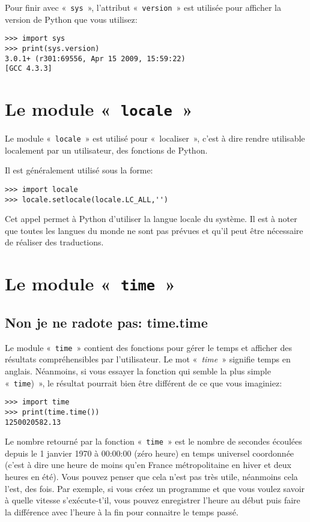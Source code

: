 Pour finir avec «~\texttt{sys}~», l'attribut «~\verb+version+~» est utilisée pour afficher la version de Python que vous utilisez:

\begin{Verbatim}[frame=single,rulecolor=\color{gray}]
>>> import sys
>>> print(sys.version)
3.0.1+ (r301:69556, Apr 15 2009, 15:59:22) 
[GCC 4.3.3]
\end{Verbatim}

\section{Le module «~\texttt{locale}~»}
Le module «~\texttt{locale}~» est utilisé pour «~localiser~», c'est à dire rendre utilisable localement par un utilisateur, des fonctions de Python.

Il est généralement utilisé sous la forme:
\begin{Verbatim}[frame=single,rulecolor=\color{gray}]
>>> import locale
>>> locale.setlocale(locale.LC_ALL,'')
\end{Verbatim}

Cet appel permet à Python d'utiliser la langue locale du système. Il est à noter que toutes les langues du monde ne sont pas prévues et qu'il peut être nécessaire de réaliser des traductions.

\section{Le module «~\texttt{time}~»}
\subsection{Non je ne radote pas: time.time }

Le module «~\texttt{time}~» contient des fonctions pour gérer le temps et afficher des résultats compréhensibles par l'utilisateur. Le mot «~\emph{time}~» signifie temps en anglais. Néanmoins, si vous essayer la fonction qui semble la plus simple «~\verb+time+)~», le résultat pourrait bien être différent de ce que vous imaginiez:

\begin{Verbatim}[frame=single,rulecolor=\color{gray}]
>>> import time
>>> print(time.time())
1250020582.13
\end{Verbatim}

Le nombre retourné par la fonction «~\texttt{time}~»  est le nombre de secondes écoulées depuis le 1 janvier 1970 à 00:00:00 (zéro heure) en temps universel coordonnée (c'est à dire une heure de moins qu'en France métropolitaine en hiver et deux heures en été). Vous pouvez penser que cela n'est pas très utile, néanmoins cela l'est, des fois. Par exemple, si vous créez un programme et que vous voulez savoir à quelle vitesse s'exécute-t'il, vous pouvez enregistrer l'heure au début puis faire la différence avec l'heure à la fin pour connaitre le temps passé.

